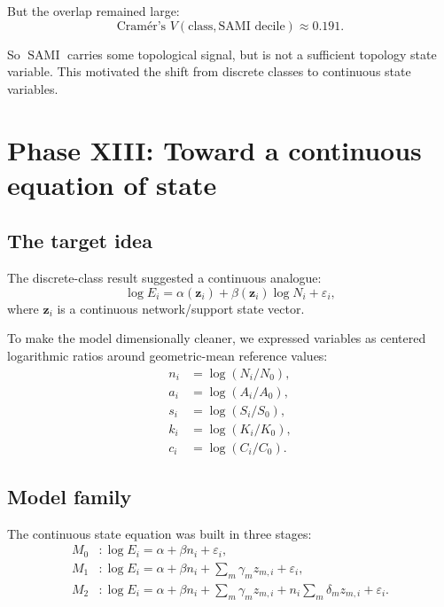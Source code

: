 \documentclass[11pt]{article}
\newcommand{\SAMI}{\operatorname{SAMI}}
\begin{document}
But the overlap remained large:
\begin{equation}
\text{Cram\'er's } V(\text{class},\text{SAMI decile}) \approx 0.191.
\end{equation}

So \(\SAMI\) carries some topological signal, but is not a sufficient topology state variable. This motivated the shift from discrete classes to continuous state variables.

\section{Phase XIII: Toward a continuous equation of state}

\subsection{The target idea}

The discrete-class result suggested a continuous analogue:
\begin{equation}
\log E_i = \alpha(\mathbf{z}_i) + \beta(\mathbf{z}_i)\log N_i + \varepsilon_i,
\label{eq:state-eq-idea}
\end{equation}
where \(\mathbf{z}_i\) is a continuous network/support state vector.

To make the model dimensionally cleaner, we expressed variables as centered logarithmic ratios around geometric-mean reference values:
\begin{align}
n_i &= \log(N_i/N_0),\\
a_i &= \log(A_i/A_0),\\
s_i &= \log(S_i/S_0),\\
k_i &= \log(K_i/K_0),\\
c_i &= \log(C_i/C_0).
\end{align}

\subsection{Model family}

The continuous state equation was built in three stages:
\begin{align}
M_0 &: \log E_i = \alpha + \beta n_i + \varepsilon_i,\\
M_1 &: \log E_i = \alpha + \beta n_i + \sum_m \gamma_m z_{m,i} + \varepsilon_i,\\
M_2 &: \log E_i = \alpha + \beta n_i + \sum_m \gamma_m z_{m,i}
+ n_i \sum_m \delta_m z_{m,i} + \varepsilon_i.
\label{eq:state-eq}
\end{align}
\end{document}
